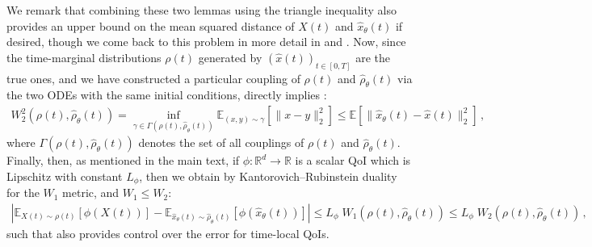 \documentclass[oneside,11pt]{article}
\theoremstyle{remark}
\begin{document}
We remark that combining these two lemmas using the triangle inequality also provides an upper bound on the mean squared distance of $X(t)$ and $\hat{x}_\theta(t)$ if desired, though we come back to this problem in more detail in  and . Now, since the time-marginal distributions $\rho(t)$ generated by $(\hat{x}(t))_{t \in [0,T]}$ are the true ones, and we have constructed a particular coupling of $\rho(t)$ and $\hat{\rho}_\theta(t)$ via the two ODEs with the same initial conditions,  directly implies :
\begin{align*}
    W_2^2(\rho(t), \hat{\rho}_\theta(t)) = \inf_{\gamma \in \Gamma(\rho(t), \hat{\rho}_\theta(t))} \mathbb{E}_{(x,y) \sim \gamma} \left[\lVert x - y \rVert_2^2 \right] \leq \mathbb{E} \left[\lVert \hat{x}_{\theta}(t) - \hat{x}(t) \rVert_2^2 \right]\,,
\end{align*}
where $\Gamma(\rho(t), \hat{\rho}_\theta(t))$ denotes the set of all couplings of $\rho(t)$ and $\hat{\rho}_\theta(t)$. Finally, then, as mentioned in the main text, if $\phi \colon \mathbb{R}^d \to \mathbb{R}$ is a scalar QoI which is Lipschitz with constant $L_\phi$, then we obtain by Kantorovich--Rubinstein duality for the $W_1$ metric, and $W_1 \leq W_2$:
\begin{align*}
    |\mathbb{E}_{X(t) \sim \rho(t)}[\phi(X(t))] - \mathbb{E}_{\hat{x}_\theta(t) \sim \hat{\rho}_\theta(t)}[\phi(\hat{x}_\theta(t))]| \leq L_\phi \; W_1(\rho(t), \hat{\rho}_\theta(t)) \leq L_\phi \; W_2(\rho(t), \hat{\rho}_\theta(t))\,,
\end{align*}
such that  also provides control over the error for time-local QoIs.
\end{document}

